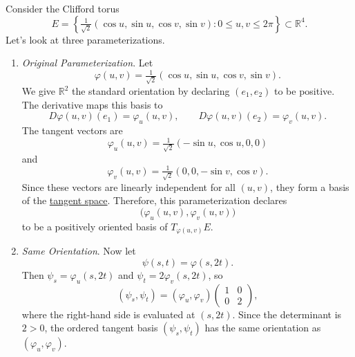 	\begin{example}
	  \label{ex:orientation-of-the-clifford-torus-in-r4}
		Consider the Clifford torus
		\begin{equation}
			E =
			\left\{
			\tfrac{1}{\sqrt{2}}(\cos u,\sin u,\cos v,\sin v)
			:
			0 \leq u,v \leq 2\pi
			\right\}
			\subset \mathbb{R}^4.
		\end{equation}
		Let's look at three parameterizations.
		\begin{enumerate}
			\item \textit{Original Parameterization}. Let
				\begin{equation}
					\varphi(u,v)
					=
					\tfrac{1}{\sqrt{2}}(\cos u,\sin u,\cos v,\sin v).
				\end{equation}
				We give $\mathbb{R}^2$ the standard orientation by declaring $(e_1,e_2)$ to be positive. The derivative maps this basis to
				\begin{equation}
					D\varphi(u,v)(e_1)=\varphi_u(u,v),
					\qquad
					D\varphi(u,v)(e_2)=\varphi_v(u,v).
				\end{equation}
				The tangent vectors are
				\begin{equation}
					\varphi_u(u,v)
					=
					\tfrac{1}{\sqrt{2}}(-\sin u,\cos u,0,0)
				\end{equation}
				and
				\begin{equation}
					\varphi_v(u,v)
					=
					\tfrac{1}{\sqrt{2}}(0,0,-\sin v,\cos v).
				\end{equation}
				Since these vectors are linearly independent for all $(u,v)$, they form a basis of the \hyperref[def:tangent-space]{tangent space}. Therefore, this parameterization declares
				\begin{equation}
					\bigl(\varphi_u(u,v),\varphi_v(u,v)\bigr)
				\end{equation}
				to be a positively oriented basis of $T_{\varphi(u,v)}E$.

			\item \textit{Same Orientation}. Now let
				\begin{equation}
					\psi(s,t)=\varphi(s,2t).
				\end{equation}
				Then $\psi_s=\varphi_u(s,2t)$ and $\psi_t=2\varphi_v(s,2t)$, so
				\begin{equation}
					(\psi_s,\psi_t)
					=
					(\varphi_u,\varphi_v)
					\begin{pmatrix}
					1 & 0 \\
					0 & 2
					\end{pmatrix},
				\end{equation}
				where the right-hand side is evaluated at $(s,2t)$. Since the determinant is $2>0$, the ordered tangent basis $(\psi_s,\psi_t)$ has the same orientation as $(\varphi_u,\varphi_v)$.


\end{enumerate}
\end{example}

